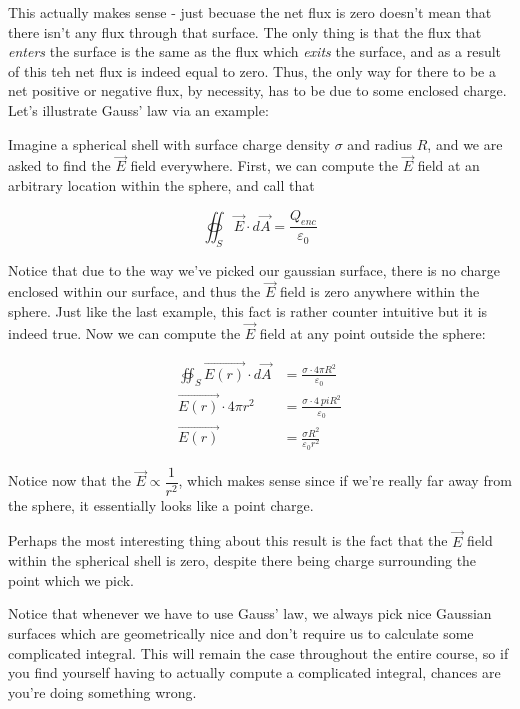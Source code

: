 \documentclass{report}
\theoremstyle{definition}
\numberwithin{equation}{section}
\numberwithin{definition}{section}
\begin{document}
    This actually makes sense - just becuase the net flux is zero doesn't mean that there isn't any flux through that surface. The only thing is that the flux that \textit{enters} the surface is the same as the flux which \textit{exits} the surface, and as a result of this teh net flux is indeed equal to zero. Thus, the only way for there to be a net positive or negative flux, by necessity, has to be due to some enclosed charge. Let's illustrate Gauss' law via an example:

    \begin{example}
        Imagine a spherical shell with surface charge density $\sigma$ and radius $R$, and we are asked to find the $\vec{E}$ field everywhere. First, we can compute the $\vec{E}$ field at an arbitrary location within the sphere, and call that 

        \[\oiint_S \vec{E} \cdot d\vec{A} = \frac{Q_{enc}}{\varepsilon_0}\]
        
        Notice that due to the way we've picked our gaussian surface, there is no charge enclosed within our surface, and thus the $\vec{E}$ field is zero anywhere within the sphere. Just like the last example, this fact is rather counter intuitive but it is indeed true. Now we can compute the $\vec{E}$ field at any point outside the sphere:

        \begin{align*}
            \oiint_S \vec{E(r)} \cdot d\vec{A} &= \frac{\sigma \cdot 4 \pi R^2}{\varepsilon_0}\\
            \vec{E(r)} \cdot 4\pi r^2 &= \frac{\sigma \cdot 4\ pi R^2}{\varepsilon_0}\\
            \vec{E(r)} &= \frac{\sigma R^2}{\varepsilon_0 r^2}
        \end{align*}

        Notice now that the $\vec{E} \propto \dfrac{1}{r^2}$, which makes sense since if we're really far away from the sphere, it essentially looks like a point charge. 

        Perhaps the most interesting thing about this result is the fact that the $\vec{E}$ field within the spherical shell is zero, despite there being charge surrounding the point which we pick. 
    \end{example}

    Notice that whenever we have to use Gauss' law, we always pick nice Gaussian surfaces which are geometrically nice and don't require us to calculate some complicated integral. This will remain the case throughout the entire course, so if you find yourself having to actually compute a complicated integral, chances are you're doing something wrong.
\end{document}
